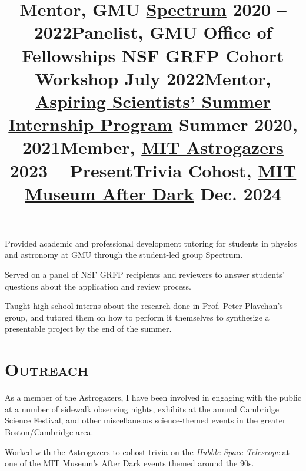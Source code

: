 \documentclass[marg, centered]{res}
\begin{document}
\begin{resume}
\vspace{-0.2cm}
\title{\textbf{Mentor}, GMU \href{https://gmuspectrum.squarespace.com/}{\color{dkbu} Spectrum} \hfill \textbf{2020 -- 2022}}
\begin{position}
{\small Provided academic and professional development tutoring for students in physics and astronomy at GMU through the student-led group Spectrum.}
\end{position}

\vspace{-0.2cm}
\title{\textbf{Panelist}, GMU Office of Fellowships NSF GRFP Cohort Workshop \hfill \textbf{July 2022}}
\begin{position}
{\small Served on a panel of NSF GRFP recipients and reviewers to answer students' questions about the application and review process.}
\end{position}

\vspace{-0.2cm}
\title{\textbf{Mentor}, \href{https://science.gmu.edu/assip}{\color{dkbu} Aspiring Scientists' Summer Internship Program} \hfill \textbf{Summer 2020, 2021}}
\begin{position}
{\small Taught high school interns about the research done in Prof. Peter Plavchan's group, and tutored them on how to perform it themselves to synthesize a presentable project by the end of the summer.}
\end{position}


\section{{\scshape \bfseries Outreach}}

\title{\textbf{Member}, \href{https://astrogazers.mit.edu/}{\color{dkbu} MIT Astrogazers} \hfill \textbf{2023 -- Present}}
\begin{position}
{\small As a member of the Astrogazers, I have been involved in engaging with the public at a number of sidewalk observing nights, exhibits at the annual Cambridge Science Festival, and other miscellaneous science-themed events in the greater Boston/Cambridge area.}
\end{position}

\vspace{-0.2cm}
\title{\textbf{Trivia Cohost}, \href{https://mitmuseum.mit.edu/programs/mit-museum-after-dark}{\color{dkbu} MIT Museum After Dark} \hfill \textbf{Dec. 2024}}
\begin{position}
{\small Worked with the Astrogazers to cohost trivia on the \textit{Hubble Space Telescope} at one of the MIT Museum's After Dark events themed around the 90s.}
\end{position}


\end{resume}
\end{document}
